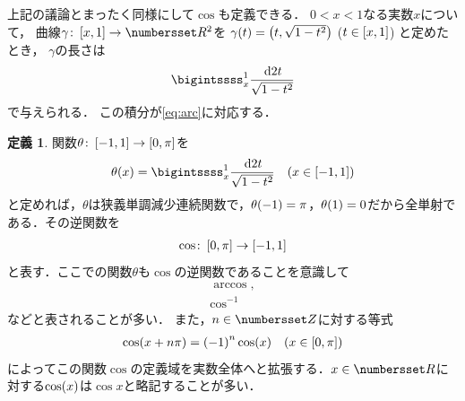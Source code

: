 \documentclass[11pt,a4paper]{ltjsarticle}
\newcommand*{\coord}[1]{\paren{#1}}
\newcommand*{\maparrow}{\rightarrow}
\newcommand*{\intd}{\dl2}
\newcommand*{\inv}[1]{{#1}^{-1}}
\theoremstyle{definition}
\newtheorem{dfn}{定義}[section]
\begin{document}
上記の議論とまったく同様にして$\cos$も定義できる．
$0 < x < 1$なる実数$x$について，
曲線$\gamma \colon \interval{c}{x,1} \maparrow \Real^2$を
$\apply{\gamma}{t} = \coord{t, \sqrt{1 - t^2}}$ ($t \in \interval{c}{x,1}$)
と定めたとき，
$\gamma$の長さは
\begin{align}
  \bigintssss_x^1 \frac{\intd t}{\sqrt{1 - t^2}}
  \label{eq:arcx}
\end{align}
で与えられる．
この積分が\cref{eq:arc}に対応する．

\begin{dfn} \label{dfn:cos}
  関数$\theta \colon \interval{c}{-1, 1} \maparrow \interval{c}{0,\pi}$を
  \begin{align}
    \apply{\theta}{x} = \bigintssss_x^1 \frac{\intd t}{\sqrt{1 - t^2}} \quad \text{($x \in \interval{c}{-1,1}$)}
    \label{eq:arcx}
  \end{align}
  と定めれば，$\theta$は狭義単調減少連続関数で，$\apply{\theta}{-1} = \pi$，$\apply{\theta}{1} = 0$だから全単射である．その逆関数を
  \begin{align}
    \cos \colon \interval{c}{0, \pi} \maparrow \interval{c}{-1,1}
    \label{eq:cos}
  \end{align}
  と表す．ここでの関数$\theta$も$\cos$の逆関数であることを意識して
  \begin{align}
    \arccos,
    \label{eq:arccos} \\
    \inv{\cos}
    \label{eq:invcos}
  \end{align}
  などと表されることが多い．
  また，$n \in \Zahlen$に対する等式
  \begin{align}
    \apply{\cos}{x + n \pi} = \paren{-1}^n \apply{\cos}{x} \quad \text{($\textstyle x \in \interval{c}{0, \pi}$)}
    \label{eq:cosperiod}
  \end{align}
  によってこの関数$\cos$の定義域を実数全体へと拡張する．$x \in \Real$に対する$\apply{\cos}{x}$は$\cos x$と略記することが多い．
\end{dfn}
\end{document}
